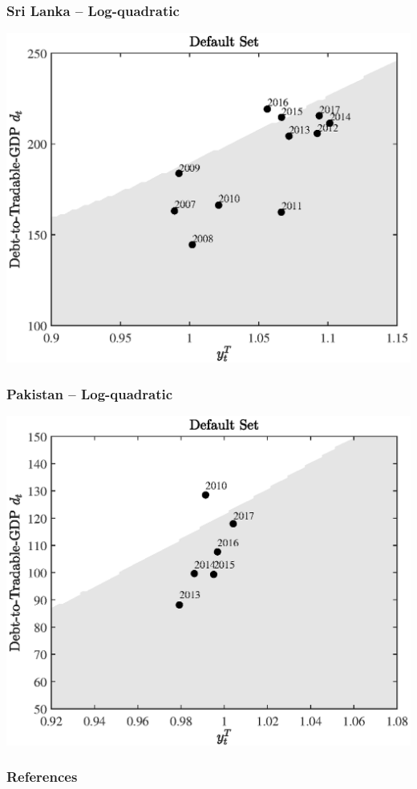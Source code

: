 \documentclass[mathserif]{beamer}
\begin{document}
    \begin{frame}
        \frametitle{Sri Lanka -- Log-quadratic}
        \centering
        \includegraphics[width = 0.8 \textwidth]{fig/default_set_sri_trad_logq_with_china.eps}
    
    \end{frame}

    \begin{frame}
        \frametitle{Pakistan -- Log-quadratic}
        \centering
        \includegraphics[width = 0.8 \textwidth]{fig/default_set_pak_trad_logq_with_china.eps}
    
    \end{frame}
    \appendix
    \begin{frame}[allowframebreaks]
            \frametitle{References}
            
            
    \end{frame}
\end{document}
